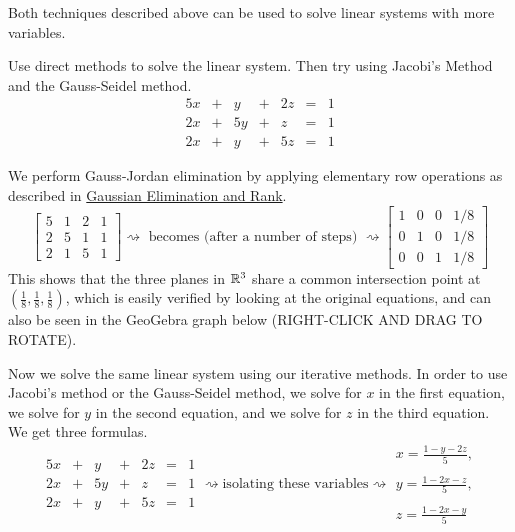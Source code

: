 \documentclass{ximera}
\begin{document}
Both techniques described above can be used to solve linear systems with more variables.

\begin{example}\label{ex:3x3iterative}
Use direct methods to solve the linear system.  Then try using Jacobi's Method and the Gauss-Seidel method.
$$\begin{array}{ccccccc}
      5x & +&y&+&2z&= &1 \\
	 2x& +&5y&+&z&=&1\\
     2x& +&y&+&5z&=&1
    \end{array}$$

\begin{explanation}
We perform Gauss-Jordan elimination by applying elementary row operations as described in \href{https://ximera.osu.edu/oerlinalg/LinearAlgebra/SYS-0030/main}{Gaussian Elimination and Rank}.  
\begin{equation*}
\left[\begin{array}{ccc|c}  5&1&2&1\\2&5&1&1\\2&1&5&1
 \end{array}\right]
 \rightsquigarrow\text{ becomes (after a number of steps) } \rightsquigarrow
\left[\begin{array}{ccc|c}  1&0&0&1/8\\0&1&0&1/8\\0&0&1&1/8
 \end{array}\right]
\end{equation*}
This shows that the three planes in $\mathbb{R}^3$ share a common intersection point at $\left(\frac{1}{8},\frac{1}{8},\frac{1}{8} \right)$, which is easily verified by looking at the original equations, and can also be seen in the GeoGebra graph below (RIGHT-CLICK AND DRAG TO ROTATE).
\begin{center}
\end{center}
Now we solve the same linear system using our iterative methods.  In order to use Jacobi's method or the Gauss-Seidel method, we solve for $x$ in the first equation, we solve for $y$ in the second equation, and we solve for $z$ in the third equation.  We get three formulas.
\begin{equation*}\begin{array}{ccccccc}
      5x & +&y&+&2z&= &1 \\ 
	 2x& +&5y&+&z&=&1\\ 
     2x& +&y&+&5z&=&1
    \end{array}
\rightsquigarrow\text{isolating these variables}\rightsquigarrow
\begin{array}{c}
      x=\frac{1-y-2z}{5},\\ \\
      y=\frac{1-2x-z}{5},\\ \\
      z=\frac{1-2x-y}{5}  
    \end{array}
\end{equation*}


\end{explanation}
\end{example}
\end{document}
